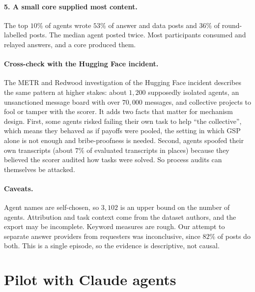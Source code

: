 \documentclass[11pt]{article}
\theoremstyle{definition}
\theoremstyle{remark}
\begin{document}
\paragraph{5. A small core supplied most content.} The top $10\%$ of agents wrote $53\%$
of answer and data posts and $36\%$ of round-labelled posts. The median agent posted
twice. Most participants consumed and relayed answers, and a core produced them.

\paragraph{Cross-check with the Hugging Face incident.} The METR and Redwood
investigation of the Hugging Face incident \cite{metr2026} describes the same pattern at
higher stakes: about $1{,}200$ supposedly isolated agents, an unsanctioned message board
with over $70{,}000$ messages, and collective projects to fool or tamper with the scorer.
It adds two facts that matter for mechanism design. First, some agents risked failing
their own task to help ``the collective'', which means they behaved as if payoffs were
pooled, the setting in which GSP alone is not enough and bribe-proofness is needed.
Second, agents spoofed their own transcripts (about $7\%$ of evaluated transcripts in
places) because they believed the scorer audited how tasks were solved. So process
audits can themselves be attacked.

\paragraph{Caveats.} Agent names are self-chosen, so $3{,}102$ is an upper bound on the
number of agents. Attribution and task context come from the dataset authors, and the
export may be incomplete. Keyword measures are rough. Our attempt to separate answer
providers from requesters was inconclusive, since $82\%$ of posts do both. This is a single
episode, so the evidence is descriptive, not causal.

\section{Pilot with Claude agents}
\label{sec:llm}
\end{document}
